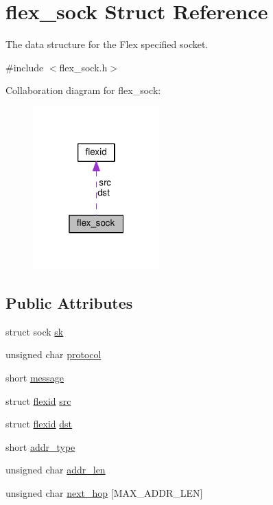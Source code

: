 \hypertarget{structflex__sock}{}\section{flex\+\_\+sock Struct Reference}
\label{structflex__sock}


The data structure for the Flex specified socket.  




{\ttfamily \#include $<$flex\+\_\+sock.\+h$>$}



Collaboration diagram for flex\+\_\+sock\+:\nopagebreak
\begin{figure}[H]
\begin{center}
\leavevmode
\includegraphics[width=139pt]{structflex__sock__coll__graph}
\end{center}
\end{figure}
\subsection*{Public Attributes}
\begin{DoxyCompactItemize}
\item 
struct sock \hyperlink{structflex__sock_a1ffc5042c0d6dd6b651ecb6a8e9b1096}{sk}
\item 
unsigned char \hyperlink{structflex__sock_acea083a0cc7f13d3491228dd261bfc70}{protocol}
\item 
short \hyperlink{structflex__sock_af4d0be6245faa22590e3d672d095a2a7}{message}
\item 
struct \hyperlink{structflexid}{flexid} \hyperlink{structflex__sock_a132b613c5f785e07196306bff98ef85d}{src}
\item 
struct \hyperlink{structflexid}{flexid} \hyperlink{structflex__sock_a1704e9612c290ef88bf674ea245b1835}{dst}
\item 
short \hyperlink{structflex__sock_afb460ef1d9e2fc1cc389ca5922f967d8}{addr\+\_\+type}
\item 
unsigned char \hyperlink{structflex__sock_a1c183d812ac68e320df127d58d303677}{addr\+\_\+len}
\item 
unsigned char \hyperlink{structflex__sock_a7c9d43f00ac325627f1396ffc10fe74a}{next\+\_\+hop} \mbox{[}M\+A\+X\+\_\+\+A\+D\+D\+R\+\_\+\+L\+EN\mbox{]}
\end{DoxyCompactItemize}



